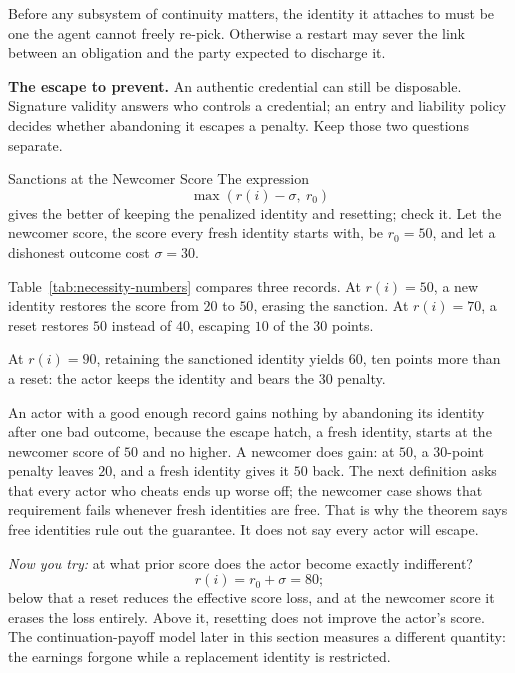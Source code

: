 \documentclass[11pt,a4paper]{article}
\theoremstyle{definition}
\begin{document}
Before any subsystem of continuity matters, the identity it attaches to must be one
the agent cannot freely re-pick. Otherwise a restart may sever the link
between an obligation and the party expected to discharge it.

%
\medskip\noindent\textbf{The escape to prevent.} An authentic credential can still be disposable. Signature validity answers who controls a credential; an entry and liability policy decides whether abandoning it escapes a penalty. Keep those two questions separate.

\begin{pdexample}{Sanctions at the Newcomer Score}
\setlength{\parskip}{4pt plus 1pt}
\label{ex:newcomer-floor}
The expression
\[
\max(r(i)-\sigma,\ r_0)
\]
gives the better of keeping the penalized identity and resetting; check it.
Let the newcomer score, the score every fresh identity starts with, be
$r_0=50$, and let a dishonest outcome cost $\sigma=30$.

Table~\ref{tab:necessity-numbers} compares three records. At $r(i)=50$, a new
identity restores the score from $20$ to $50$, erasing the sanction. At
$r(i)=70$, a reset restores $50$ instead of $40$, escaping $10$ of the $30$
points.

At
$r(i)=90$, retaining the sanctioned identity yields $60$, ten points more
than a reset: the actor keeps the identity and bears the $30$ penalty.

An actor with a good enough record gains nothing by abandoning its identity
after one bad outcome, because the escape hatch, a fresh identity, starts at
the newcomer score of $50$ and no higher. A newcomer does gain: at $50$, a $30$-point penalty
leaves $20$, and a fresh identity gives it $50$ back. The next definition asks
that every actor who cheats ends up worse off; the newcomer case shows that
requirement fails whenever fresh identities are free. That is why the theorem
says free identities rule out the guarantee. It does not say every actor will
escape.

\emph{Now you try:} at what prior score does the actor
become exactly indifferent?
\[
r(i)=r_0+\sigma=80;
\]
below that a reset reduces the effective score loss, and at the newcomer
score it erases the loss entirely. Above it, resetting does not improve the
actor's score. The continuation-payoff model later in this section measures a
different quantity: the earnings forgone while a replacement identity is
restricted.
\end{pdexample}
\end{document}

